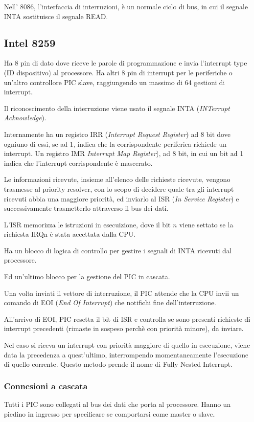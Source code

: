 \documentclass[../template]{subfiles}
\begin{document}
Nell' 8086, l'interfaccia di interruzioni, è un normale ciclo di bus, in cui il segnale INTA sostituisce il segnale READ.

\subsection{Intel 8259}
Ha 8 pin di dato dove riceve le parole di programmazione e invia l'interrupt type (ID dispositivo) al processore.
Ha altri 8 pin di interrupt per le periferiche o un'altro controllore PIC slave, raggiungendo un massimo di 64 gestioni di interrupt.

Il riconoscimento della interruzione viene usato il segnale INTA (\textit{INTerrupt Acknowledge}).

Internamente ha un registro IRR (\textit{Interrupt Request Register}) ad 8 bit dove ogniuno di essi, se ad 1, indica che la corrispondente periferica richiede un interrupt.
Un registro IMR \textit{Interrupt Map Register}), ad 8 bit, in cui un bit ad 1 indica che l'interrupt corrispondente è mascerato.

Le informazioni ricevute, insieme all'elenco delle richieste ricevute, vengono trasmesse al priority resolver, con lo scopo di decidere quale tra gli interrupt ricevuti abbia una maggiore priorità, ed inviarlo al ISR (\textit{In Service Register}) e successivamente trasmetterlo attraverso il bus dei dati.

L'ISR memorizza le istruzioni in esecuizione, dove il bit $n$ viene settato se la richiesta IRQn è stata accettata dalla CPU.

Ha un blocco di logica di controllo per gestire i segnali di INTA ricevuti dal processore.

Ed un'ultimo blocco per la gestione del PIC in cascata.

Una volta inviati il vettore di interruzione, il PIC attende che la CPU invii un comando di EOI (\textit{End Of Interrupt}) che notifichi fine dell'interruzione.

All'arrivo di EOI, PIC resetta il bit di ISR e controlla se sono presenti richieste di interrupt precedenti (rimaste in sospeso perchè con priorità minore), da inviare.

Nel caso si riceva un interrupt con priorità maggiore di quello in esecuzione, viene data la precedenza a quest'ultimo, interrompendo momentaneamente l'esecuzione di quello corrente. Questo metodo prende il nome di Fully Nested Interrupt.

\subsubsection{Connesioni a cascata}
Tutti i PIC sono collegati al bus dei dati che porta al processore. Hanno un piedino in ingresso per specificare se comportarsi come master o slave.
\end{document}
